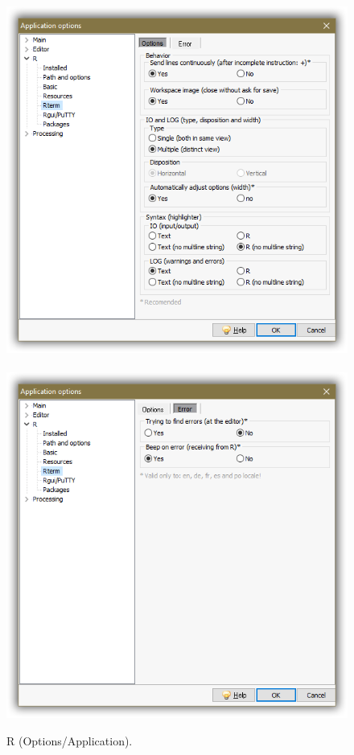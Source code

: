 \begin{figure}[h!]
  \includegraphics[scale=0.35]{./res/app_r_rterm_options.png}~~
  \includegraphics[scale=0.35]{./res/app_r_rterm_error.png}\\
  \caption{R (Options/Application).}
  \label{fig:app_r_d}
\end{figure}


